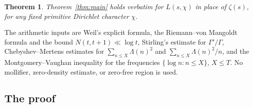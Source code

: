 \documentclass[11pt]{amsart}
\newtheorem{maintheorem}{Theorem}
\theoremstyle{definition}
\theoremstyle{remark}
\numberwithin{equation}{section}
\begin{document}
\begin{maintheorem}\label{thm:L}
Theorem~\ref{thm:main} holds verbatim for $L(s,\chi)$ in place of $\zeta(s)$, for any fixed primitive Dirichlet character $\chi$.
\end{maintheorem}

\noindent The arithmetic inputs are Weil's explicit formula, the Riemann--von Mangoldt formula and the bound $N(t,t+1)\ll\log t$, Stirling's estimate for $\Gamma'/\Gamma$, Chebyshev--Mertens estimates for $\sum_{n\le X}\Lambda(n)^2$ and $\sum_{n\le X}\Lambda(n)^2/n$, and the Montgomery--Vaughan inequality for the frequencies $\{\log n:n\le X\}$, $X\le T$. No mollifier, zero-density estimate, or zero-free region is used.

\subsection{The proof}\label{subsec:idea}
\end{document}
